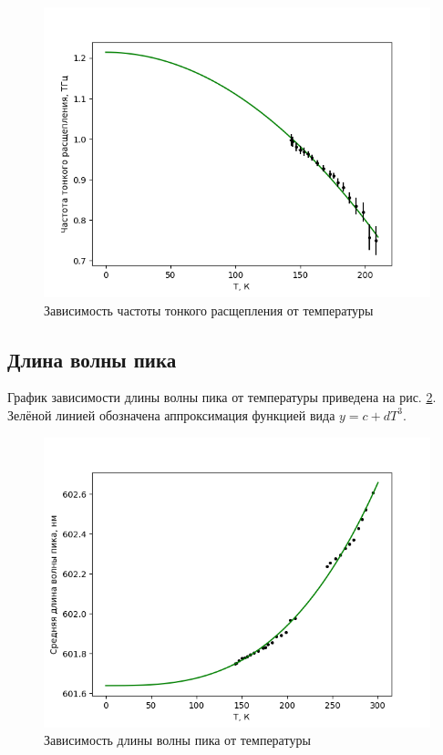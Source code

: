 \begin{figure}[!h]
    \begin{center}
        \includegraphics[width=0.9 \linewidth]{delta_frequence.png}
        \caption{Зависимость частоты тонкого расщепления от температуры}
        \label{delta_frequence}
    \end{center}
\end{figure}


\subsection{Длина волны пика}
График зависимости длины волны пика от температуры приведена на рис. 
\ref{mean_peak_wavelenght}. Зелёной линией обозначена аппроксимация 
функцией вида $y = c + dT^3$.


\begin{figure}[!h]
    \begin{center}
        \includegraphics[width=0.9 \linewidth]{mean_peak_wavelenght.png}
        \caption{Зависимость длины волны пика от температуры}
        \label{mean_peak_wavelenght}
    \end{center}
\end{figure}



